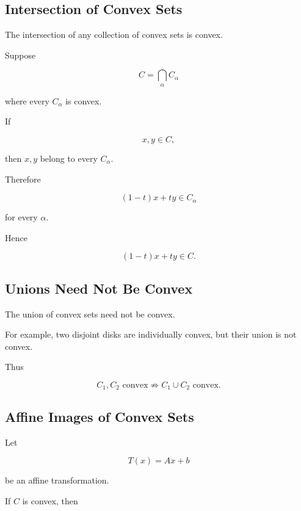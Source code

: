 \subsection{Intersection of Convex Sets}
\label{subsec:intersection-convex-sets}

\begin{theorem}
The intersection of any collection of convex sets is convex.
\end{theorem}

Suppose

\[
C=\bigcap_{\alpha}C_\alpha
\]

where every \(C_\alpha\) is convex.

If

\[
x,y\in C,
\]

then \(x,y\) belong to every \(C_\alpha\).

Therefore

\[
(1-t)x+ty\in C_\alpha
\]

for every \(\alpha\).

Hence

\[
\boxed{
(1-t)x+ty\in C.
}
\]

\subsection{Unions Need Not Be Convex}
\label{subsec:union-convex-sets}

The union of convex sets need not be convex.

For example, two disjoint disks are individually convex, but their union is
not convex.

Thus

\[
\boxed{
C_1,C_2\text{ convex}
\not\Longrightarrow
C_1\cup C_2\text{ convex}.
}
\]

\subsection{Affine Images of Convex Sets}
\label{subsec:affine-images-convex}

Let

\[
T(x)=Ax+b
\]

be an affine transformation.

If \(C\) is convex, then

